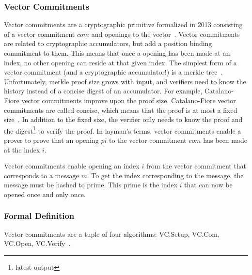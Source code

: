 \subsubsection{Vector Commitments}
Vector commitments are a cryptographic primitive formalized in 2013 consisting of a vector commitment \(com\) and openings to the vector~\cite{Catalano2013-jn}. Vector commitments are related to cryptographic accumulators, but add a position binding commitment to them. This means that once a opening has been made at an index, no other opening can reside at that given index.
The simplest form of a vector commitment (and a cryptographic accumulator!) is a merkle tree~\cite{Nitulescu_undated-xf}. Unfortunately, merkle proof size grows with input, and verifiers need to know the history instead of a concise digest of an accumulator. For example, Catalano-Fiore vector commitments improve upon the proof size. Catalano-Fiore vector commitments are called concise, which means that the proof is at most a fixed size~\cite{Catalano2013-jn}. In addition to the fixed size, the verifier only needs to know the proof and the digest\footnote{latest output} to verify the proof. In layman's terms, vector commitments enable a prover to prove that an opening \(pi\) to the vector commitment \(com\) has been made at the index \(i\).

Vector commitments enable opening an index \(i\) from the vector commitment that corresponds to a message \(m\). To get the index corresponding to the message, the message must be hashed to prime. This prime is the index \(i\) that can now be opened once and only once.

\subsubsection{Formal Definition}
Vector commitments are a tuple of four algorithms: VC.Setup, VC.Com, VC.Open, VC.Verify~\cite{Boneh2019-tk}.


